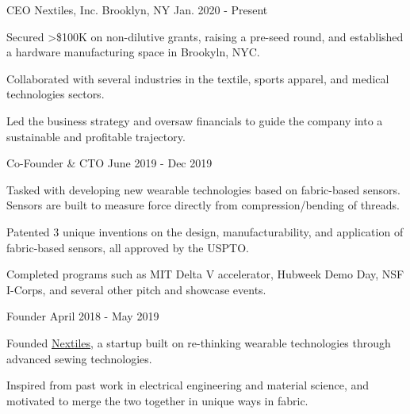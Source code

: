 
\newcommand{\patents}{3}
\newcommand{\raised}{100K}

\begin{cventries}

\cventry
    {CEO} %
    {Nextiles, Inc.} %
    {Brooklyn, NY} %
    {Jan. 2020 - Present} %
    {
      \begin{cvitems} %
        \item {Secured >\$\raised{} on non-dilutive grants, raising a pre-seed round, and established a hardware manufacturing space in Brookyln, NYC.}
        \item {Collaborated with several industries in the textile, sports apparel, and medical technologies sectors.}
        \item {Led the business strategy and oversaw financials to guide the company into a sustainable and profitable trajectory.}
      \end{cvitems}
    }

\cventry
    {Co-Founder \& CTO} %
    {} %
    {} %
    {June 2019 - Dec 2019} %
    {
      \begin{cvitems} %
        \item {Tasked with developing new wearable technologies based on fabric-based sensors. Sensors are built to measure force directly from compression/bending of threads.}
        \item {Patented \patents{} unique inventions on the design, manufacturability, and application of fabric-based sensors, all approved by the USPTO.}
        \item {Completed programs such as MIT Delta V accelerator, Hubweek Demo Day, NSF I-Corps, and several other pitch and showcase events.}
      \end{cvitems}
    }

\cventry
    {Founder} %
    {} %
    {} %
    {April 2018 - May 2019}
    {
      \begin{cvitems} %
        \item {Founded \href{www.Nextiles.tech}{Nextiles}, a startup built on re-thinking wearable technologies through advanced sewing technologies.}
        \item {Inspired from past work in electrical engineering and material science, and motivated to merge the two together in unique ways in fabric.}
      \end{cvitems}
    }


\end{cventries}
